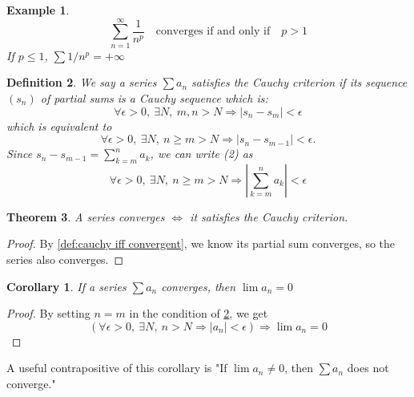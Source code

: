 \documentclass[12pt, lettersize]{book}
\newtheorem{thm}{Theorem}[section]
\newtheorem{dfn}[thm]{Definition}
\newtheorem{eg}[thm]{Example}
\newtheorem{cor}{Corollary}[thm]
\begin{document}
	\begin{eg}
		\begin{displaymath}
			\sum_{n=1}^{\infty}\frac{1}{n^p}\quad \text{converges if and only if}\quad p>1
		\end{displaymath}
		If $p\leq1$, $\sum1/n^p=+\infty$
	\end{eg}
	
	\setcounter{equation}{0}
	\begin{dfn}\label{def:cauchy criterion}
		We say a series $\sum a_n$ satisfies the \emph{Cauchy criterion} if its sequence $(s_n)$ of partial sums is a
		Cauchy sequence which is:
		\begin{equation}
			\forall\epsilon>0,\ \exists N,\ m,n>N\Rightarrow|s_n-s_m|<\epsilon
		\end{equation}
		which is equivalent to
		\begin{equation}
			\forall\epsilon>0,\ \exists N,\ n\geq m>N\Rightarrow|s_n-s_{m-1}|<\epsilon.
		\end{equation}
		Since $s_n-s_{m-1}=\sum_{k=m}^{n}a_k$, we can write (2) as
		\begin{equation}
			\forall\epsilon>0,\ \exists N,\ n\geq m>N\Rightarrow\left|\sum_{k=m}^{n}a_k\right|<\epsilon
		\end{equation}
	\end{dfn}
	
	\begin{thm}
		A series converges $\iff$ it satisfies the Cauchy criterion. 
	\end{thm}
	\begin{proof}
		By \ref{def:cauchy iff convergent}, we know its partial sum converges, so the series also converges.
	\end{proof}
	\begin{cor}\label{def:If a_n converges then lim(a_n)=0}
		If a series $\sum a_n$ converges, then $\lim a_n=0$
	\end{cor}
	\begin{proof}
		By setting $n=m$ in the condition of \ref{def:cauchy criterion}, we get
		\begin{displaymath}
			\left(\forall\epsilon>0,\ \exists N,\ n>N\Rightarrow\left|a_n\right|<\epsilon\right)\Rightarrow\lim a_n=0
		\end{displaymath}
	\end{proof}
	A useful contrapositive of this corollary is "If $\lim a_n\neq0$, then $\sum a_n$ does not converge."
	
\end{document}
